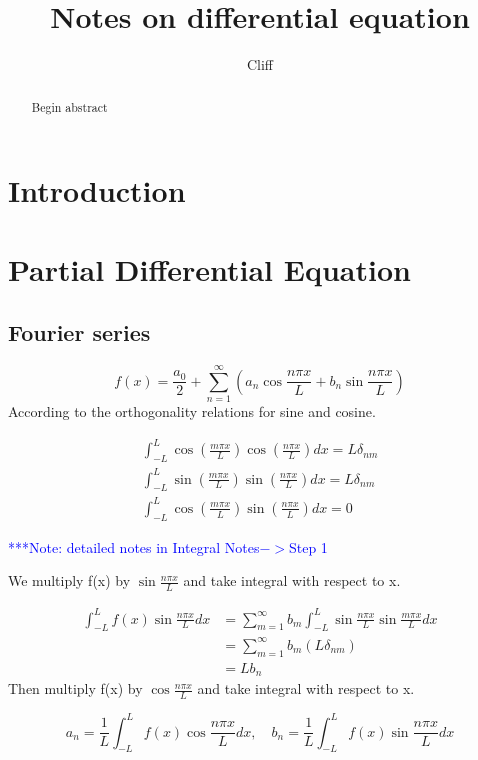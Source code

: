 \documentclass[a4]{article}
\title{Notes on differential equation}
\author{Cliff}
\begin{document}
\maketitle

\begin{abstract}
\noindent Begin abstract
\end{abstract}



\section{Introduction}
\section{Partial Differential Equation}
\subsection{Fourier series}
\begin{equation}f(x)=\frac{a_{0}}{2}+\sum_{n=1}^{\infty}\left(a_{n} \cos \frac{n \pi x}{L}+b_{n} \sin \frac{n \pi x}{L}\right)\end{equation}
According to the orthogonality relations for sine and cosine. \par 
\begin{equation}\begin{array}{c}
\int_{-L}^{L} \cos \left(\frac{m \pi x}{L}\right) \cos \left(\frac{n \pi x}{L}\right) d x=L \delta_{n m} \\
\int_{-L}^{L} \sin \left(\frac{m \pi x}{L}\right) \sin \left(\frac{n \pi x}{L}\right) d x=L \delta_{n m} \\
\int_{-L}^{L} \cos \left(\frac{m \pi x}{L}\right) \sin \left(\frac{n \pi x}{L}\right) d x=0
\end{array}\end{equation}\par
\textcolor{blue}{***Note: detailed notes in Integral Notes$->$Step 1}\par
\bigbreak 
We multiply f(x) by $\sin \frac{n\pi x}{L}$ and take integral with respect to x.\par 

\begin{equation}\begin{aligned}
\int_{-L}^{L} f(x) \sin \frac{n \pi x}{L} d x &=\sum_{m=1}^{\infty} b_{m} \int_{-L}^{L} \sin \frac{n \pi x}{L} \sin \frac{m \pi x}{L} d x \\
&=\sum_{m=1}^{\infty} b_{m}\left(L \delta_{n m}\right) \\
&=L b_{n}
\end{aligned}\end{equation}
Then multiply f(x) by $\cos \frac{n\pi x}{L}$ and take integral with respect to x.\par 
\begin{equation}a_{n}=\frac{1}{L} \int_{-L}^{L} f(x) \cos \frac{n \pi x}{L} d x, \quad b_{n}=\frac{1}{L} \int_{-L}^{L} f(x) \sin \frac{n \pi x}{L} d x\end{equation}
\end{document}
